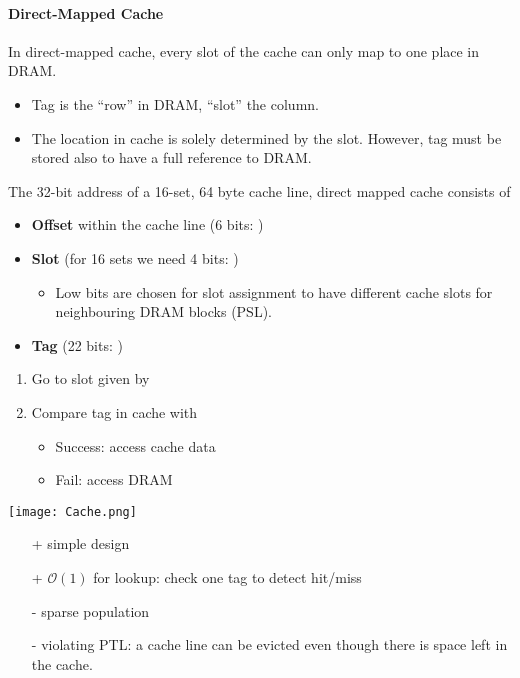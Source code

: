 \paragraph{Direct-Mapped Cache}
In direct-mapped cache, every slot of the cache can only map to one place in DRAM.
\begin{itemize}
    \item Tag is the ``row'' in DRAM, ``slot'' the column.
    \item The location in cache is solely determined by the slot. However, tag must be stored also to have a full reference to DRAM.
\end{itemize}

\newpar{}

The 32-bit address of a 16-set, 64 byte cache line, direct mapped cache consists of
\begin{itemize}
    \item \textbf{Offset} within the cache line (6 bits: )
    \item \textbf{Slot} (for 16 sets we need 4 bits: )
    \begin{itemize}
        \item Low bits are chosen for slot assignment to have different cache slots for neighbouring DRAM blocks (PSL).
    \end{itemize}
    \item \textbf{Tag} (22 bits: )
\end{itemize}

\newpar{}

\begin{enumerate}
    \item Go to slot given by 
    \item Compare tag in cache with 
    \begin{itemize}
        \item Success: access cache data
        \item Fail: access DRAM
    \end{itemize}
\end{enumerate}

\texttt{[image: Cache.png]}
\newpar{}
\begin{itemize}
    \item[+] simple design
    \item[+] $\mathcal{O}(1)$ for lookup: check one tag to detect hit/miss
    \item[-] sparse population
    \item[-] violating PTL: a cache line can be evicted even though there is space left in the cache.
\end{itemize}

